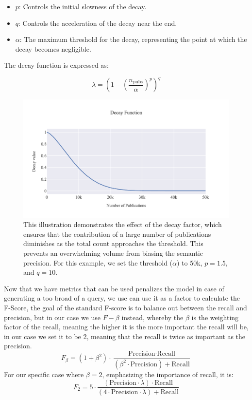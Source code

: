 \begin{itemize}
	\item \( p \): Controls the initial slowness of the decay.
	\item \( q \): Controls the acceleration of the decay near the end.
	\item $\alpha$: The maximum threshold for the decay, representing the point at which the decay becomes negligible.
\end{itemize}

The decay function is expressed as:

\[
\lambda = \left(1 - \left(\frac{n_{\text{pubs}}}{\alpha}\right)^p\right)^q
\]


\begin{figure}[h!]
	\centering	
	\includegraphics[scale=0.7]{pics/decay_function.pdf}
	\caption[Decay function for semantic precision]{This illustration demonstrates the effect of the decay factor, which ensures that the contribution of a large number of publications diminishes as the total count approaches the threshold. This prevents an overwhelming volume from biasing the semantic precision. For this example, we set the threshold (\( \alpha \)) to 50k, \( p=1.5 \), and \( q=10 \).}	
	\label{fig:decay-function}
\end{figure}


Now that we have metrics that can be used penalizes the model in case of generating a too broad of a query, we use can use it as a factor to calculate the F-Score, the goal of the standard F-score is to balance out between the recall and precision, but in our case we use $F-\beta$ instead, whereby the $\beta$ is the weighting factor of the recall, meaning the higher it is the more important the recall will be, in our case we set it to be 2, meaning that the recall is twice as important as the precision.
\begin{equation}\label{eq:f-beta}
F_\beta = (1 + \beta^2) \cdot \frac{\text{Precision} \cdot \text{Recall}}{(\beta^2 \cdot \text{Precision}) + \text{Recall}}
\end{equation}
For our specific case where $\beta = 2$, emphasizing the importance of recall, it is:
\[
	F_2 = 5 \cdot \frac{(\text{Precision} \cdot \lambda) \cdot \text{Recall}}{(4 \cdot \text{Precision}\cdot \lambda) + \text{Recall}}
\]

